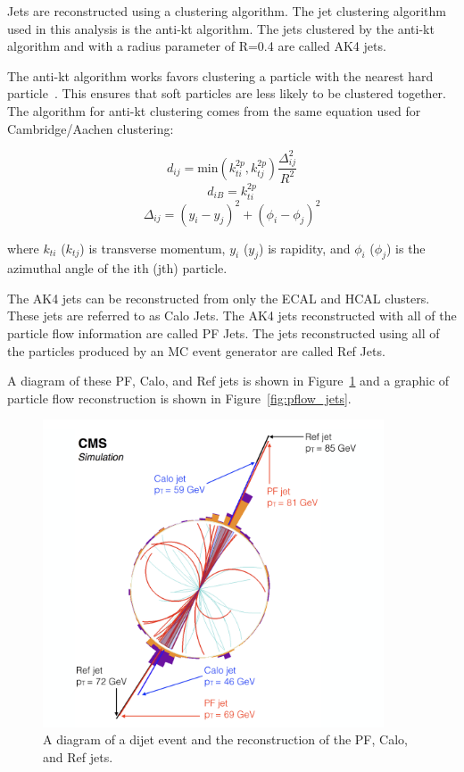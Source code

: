Jets are reconstructed using a clustering algorithm. The jet clustering algorithm used in this analysis is the anti-kt algorithm. The jets clustered by the anti-kt algorithm and with a radius parameter of R=0.4 are called AK4 jets. 

The anti-kt algorithm works favors clustering a particle with the nearest hard particle~\cite{anti-kt}. This ensures that soft particles are less likely to be clustered together. The algorithm for anti-kt clustering comes from the same equation used for Cambridge/Aachen clustering:

\begin{equation}
	d_{ij} = \text{min} \left( k^{2p}_{ti}, k^{2p}_{tj} \right) \frac{\Delta^2_{ij}}{R^2}
\end{equation}
\begin{equation}
	d_{iB} = k^{2p}_{ti}
\end{equation}
\begin{equation}
	\Delta_{ij} = (y_i - y_j)^2 + (\phi_i - \phi_j)^2
\end{equation}

where $k_{ti}$ ($k_{tj}$) is transverse momentum, $y_i$ ($y_j$) is rapidity, and $\phi_i$ ($\phi_j$) is the azimuthal angle of the ith (jth) particle.

The AK4 jets can be reconstructed from only the ECAL and HCAL clusters. These jets are referred to as Calo Jets. The AK4 jets reconstructed with all of the particle flow information are called PF Jets. The jets reconstructed using all of the particles produced by an MC event generator are called Ref Jets. 


A diagram of these PF, Calo, and Ref jets is shown in Figure~\ref{fig:pfjet} and a graphic of particle flow reconstruction is shown in Figure~\ref{fig:pflow_jets}.

\begin{figure}[h]
\centering
\includegraphics[width=0.9\textwidth]{figures/pf_jet_diagram}
\caption{A diagram of a dijet event and the reconstruction of the PF, Calo, and Ref jets.}
\label{fig:pfjet}
\end{figure}




